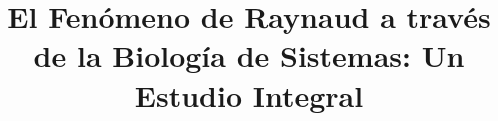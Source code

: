 \documentclass{bmcart}
\begin{document}
	\begin{frontmatter}
	
		\begin{fmbox}
			
			
			\title{El Fenómeno de Raynaud a través de la Biología de Sistemas: Un Estudio Integral}
			
			
			\author[
			  addressref={aff1},                   %
			  corref={aff1},                       %
			  email={jane.e.doe@cambridge.co.uk}   %
			]{ } %
			\author[
			  addressref={aff1},
			  email={john.RS.Smith@cambridge.co.uk}
			]{ }
			
			
			\address[id=aff1]{%
			  ,             %
			  ,          %
			  ,                              %
			}
		
		\end{fmbox}%
		
		\begin{abstractbox}
		
			\begin{abstract} %
			
			
			\end{abstract}
			
			
			\begin{keyword}
			\end{keyword}
		
		
		\end{abstractbox}
	
	\end{frontmatter}
	
\end{document}
